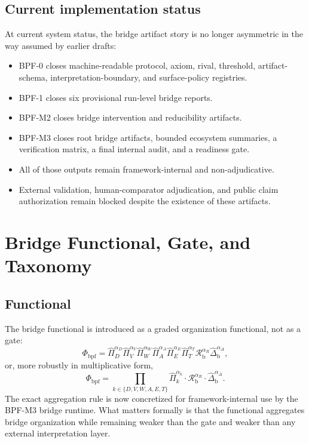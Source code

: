 \documentclass[11pt,a4paper]{article}
\theoremstyle{definition}
\newcommand{\PhiBridge}{\Phi_{\mathrm{bpf}}}
\newcommand{\BridgeMargin}{\mathcal{R}_{\mathrm{b}}}
\begin{document}
\subsection{Current implementation status}
At current system status, the bridge artifact story is no longer asymmetric in the way assumed by earlier drafts:
\begin{itemize}[leftmargin=1.5em]
\item BPF-0 closes machine-readable protocol, axiom, rival, threshold, artifact-schema, interpretation-boundary, and surface-policy registries.
\item BPF-1 closes six provisional run-level bridge reports.
\item BPF-M2 closes bridge intervention and reducibility artifacts.
\item BPF-M3 closes root bridge artifacts, bounded ecosystem summaries, a verification matrix, a final internal audit, and a readiness gate.
\item All of those outputs remain framework-internal and non-adjudicative.
\item External validation, human-comparator adjudication, and public claim authorization remain blocked despite the existence of these artifacts.
\end{itemize}

\section{Bridge Functional, Gate, and Taxonomy}
\subsection{Functional}
The bridge functional is introduced as a graded organization functional, not as a gate:
\[
\PhiBridge
=
\widehat{\Pi}_D^{\alpha_D}
\widehat{\Pi}_V^{\alpha_V}
\widehat{\Pi}_W^{\alpha_W}
\widehat{\Pi}_A^{\alpha_A}
\widehat{\Pi}_E^{\alpha_E}
\widehat{\Pi}_T^{\alpha_T}
\BridgeMargin^{\alpha_R}
\widehat{\Delta}_{\mathrm{b}}^{\alpha_\Delta},
\]
or, more robustly in multiplicative form,
\[
\PhiBridge
=
\prod_{k\in \{D,V,W,A,E,T\}}
\widehat{\Pi}_k^{\alpha_k}
\cdot
\BridgeMargin^{\alpha_R}
\cdot
\widehat{\Delta}_{\mathrm{b}}^{\alpha_\Delta}.
\]
The exact aggregation rule is now concretized for framework-internal use by the BPF-M3 bridge runtime. What matters formally is that the functional aggregates bridge organization while remaining weaker than the gate and weaker than any external interpretation layer.
\end{document}
